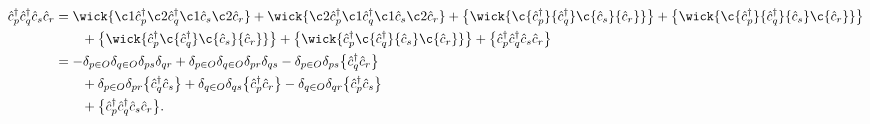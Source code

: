         \begin{align}
            \ccr{p}\ccr{q}\can{s}\can{r}
            &=
            \wick{
                \c1 {\ccr{p}}
                \c2 {\ccr{q}}
                \c1 {\can{s}}
                \c2 {\can{r}}
            }
            +
            \wick{
                \c2 {\ccr{p}}
                \c1 {\ccr{q}}
                \c1 {\can{s}}
                \c2 {\can{r}}
            }
            + \normalord{
                \wick{
                    \c {\ccr{p}}
                    {\ccr{q}}
                    \c {\can{s}}
                    {\can{r}}
                }
            }
            + \normalord{
                \wick{
                    \c {\ccr{p}}
                    {\ccr{q}}
                    {\can{s}}
                    \c {\can{r}}
                }
            }
            \nonumber \\
            &\qquad
            + \normalord{
                \wick{
                    {\ccr{p}}
                    \c {\ccr{q}}
                    \c {\can{s}}
                    {\can{r}}
                }
            }
            + \normalord{
                \wick{
                    {\ccr{p}}
                    \c {\ccr{q}}
                    {\can{s}}
                    \c {\can{r}}
                }
            }
            + \normalord{
                {\ccr{p}}
                {\ccr{q}}
                {\can{s}}
                {\can{r}}
            }
            \\
            &=
            -\delta_{p \in O}
            \delta_{q \in O}
            \delta_{ps}
            \delta_{qr}
            + \delta_{p \in O}
            \delta_{q \in O}
            \delta_{pr}
            \delta_{qs}
            - \delta_{p \in O}
            \delta_{ps}
            \normalord{
                \ccr{q}
                \can{r}
            }
            \nonumber \\
            &\qquad
            + \delta_{p \in O}
            \delta_{pr}
            \normalord{
                \ccr{q}
                \can{s}
            }
            + \delta_{q \in O}
            \delta_{qs}
            \normalord{
                \ccr{p}
                \can{r}
            }
            - \delta_{q \in O}
            \delta_{qr}
            \normalord{
                \ccr{p}
                \can{s}
            }
            \nonumber \\
            &\qquad
            + \normalord{
                {\ccr{p}}
                {\ccr{q}}
                {\can{s}}
                {\can{r}}
            }.
            \label{eq:two-hamil-op-wick}
        \end{align}

